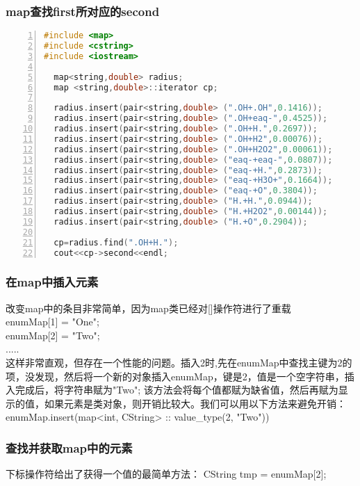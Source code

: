 \documentclass[11pt,a4paper,titlepage]{article}
\begin{document}
\subsubsection{\kai map查找first所对应的second}
\begin{lstlisting}[language=C++, numbers=left]
#include <map>
#include <cstring>
#include <iostream>

  map<string,double> radius;
  map <string,double>::iterator cp;
  
  radius.insert(pair<string,double> (".OH+.OH",0.1416));
  radius.insert(pair<string,double> (".OH+eaq-",0.4525));
  radius.insert(pair<string,double> (".OH+H.",0.2697));
  radius.insert(pair<string,double> (".OH+H2",0.00076));
  radius.insert(pair<string,double> (".OH+H2O2",0.00061));
  radius.insert(pair<string,double> ("eaq-+eaq-",0.0807));
  radius.insert(pair<string,double> ("eaq-+H.",0.2873));
  radius.insert(pair<string,double> ("eaq-+H3O+",0.1664));
  radius.insert(pair<string,double> ("eaq-+O",0.3804));
  radius.insert(pair<string,double> ("H.+H.",0.0944));
  radius.insert(pair<string,double> ("H.+H2O2",0.00144));
  radius.insert(pair<string,double> ("H.+O",0.2904));

  cp=radius.find(".OH+H.");
  cout<<cp->second<<endl;
\end{lstlisting}

\subsubsection{\kai 在map中插入元素}
改变map中的条目非常简单，因为map类已经对[]操作符进行了重载\\
enumMap[1] = "One";\\
enumMap[2] = "Two";\\
.....\\

这样非常直观，但存在一个性能的问题。插入2时,先在enumMap中查找主键为2的项，没发现，然后将一个新的对象插入enumMap，键是2，值是一个空字符串，插入完成后，将字符串赋为"Two"; 该方法会将每个值都赋为缺省值，然后再赋为显示的值，如果元素是类对象，则开销比较大。我们可以用以下方法来避免开销：\\
enumMap.insert(map<int, CString> :: value\_type(2, "Two"))\\

\subsubsection{\kai 查找并获取map中的元素 }
下标操作符给出了获得一个值的最简单方法：
CString tmp = enumMap[2];
\end{document}
